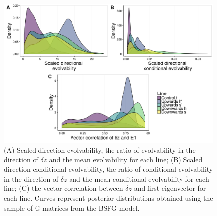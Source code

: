 \begin{refsection}
\begin{figure}
\centering
\includegraphics[width = 12cm]{chapter_ratones/media/SI/figureS10_Fig4Gversion.png}
\caption[Directional evolutionary statistics in the G-matrix]{(A) Scaled direction evolvability, the ratio of evolvability in the direction of $\delta z$ and the mean evolvability for each line; (B) Scaled direction conditional evolvability, the ratio of conditional evolvability in the direction of $\delta z$ and the mean conditional evolvability for each line; (C) the vector correlation between $\delta z$ and first eigenvector for each line. Curves represent posterior distributions obtained using the sample of G-matrices from the BSFG model.}
\end{figure}

\end{refsection}
